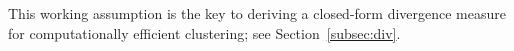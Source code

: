 \documentclass[12pt]{article}
\DeclareMathOperator{\CE}{\mathrm{CE}}
\begin{document}
This working assumption is the key to deriving a closed-form divergence measure for computationally efficient clustering; see Section~\ref{subsec:div}.
\end{document}
